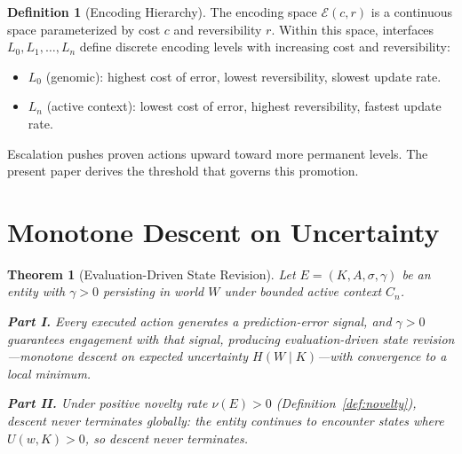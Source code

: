 \documentclass[11pt]{article}
\newtheorem{theorem}{Theorem}
\theoremstyle{definition}
\newtheorem{definition}{Definition}
\begin{document}
\begin{definition}[Encoding Hierarchy]
\label{def:hierarchy}
The encoding space $\mathcal{E}(c, r)$ is a continuous space
parameterized by cost $c$ and reversibility $r$. Within this space,
interfaces $L_0, L_1, \ldots, L_n$ define discrete encoding levels
with increasing cost and reversibility:
\begin{itemize}
\item $L_0$ (genomic): highest cost of error, lowest reversibility,
   slowest update rate.
\item $L_n$ (active context): lowest cost of error, highest
   reversibility, fastest update rate.
\end{itemize}
Escalation \cite{McCarthy2026b} pushes proven actions
upward toward more permanent levels. The present paper derives the
threshold that governs this promotion.
\end{definition}

\section{Monotone Descent on Uncertainty}
\label{sec:descent}

\begin{theorem}[Evaluation-Driven State Revision]
\label{thm:gradient}
Let $E = (K, A, \sigma, \gamma)$ be an entity with $\gamma > 0$ persisting in
world $W$ under bounded active context $C_n$.

\textbf{Part I.} Every executed action generates a prediction-error
signal, and $\gamma > 0$ guarantees engagement with that signal,
producing evaluation-driven state revision---monotone descent on
expected uncertainty $H(W \mid K)$---with convergence to a local
minimum.

\textbf{Part II.} Under positive novelty rate $\nu(E) > 0$
(Definition~\ref{def:novelty}), descent never terminates globally:
the entity continues to encounter states where $U(w,K) > 0$, so
descent never terminates.
\end{theorem}
\end{document}
